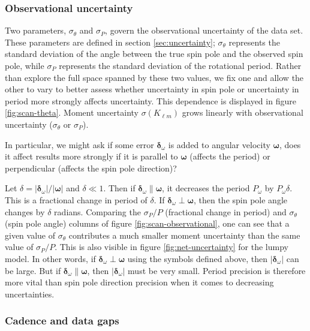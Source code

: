\documentclass[fleqn,usenatbib]{mnras}
\begin{document}
\subsubsection{Observational uncertainty}
\label{sec:scan-uncertainty}
Two parameters, $\sigma_\theta$ and $\sigma_P$, govern the observational uncertainty of the data set. These parameters are defined in section \ref{sec:uncertainty}; $\sigma_\theta$ represents the standard deviation of the angle between the true spin pole and the observed spin pole, while $\sigma_P$ represents the standard deviation of the rotational period. Rather than explore the full space spanned by these two values, we fix one and allow the other to vary to better assess whether uncertainty in spin pole or uncertainty in period more strongly affects uncertainty. This dependence is displayed in figure \ref{fig:scan-theta}. Moment uncertainty $\sigma(K_{\ell m})$ grows linearly with observational uncertainty ($\sigma_\theta$ or $\sigma_P$).

In particular, we might ask if some error $\bm {\delta}_\omega$ is added to angular velocity $\bm \omega$, does it affect results more strongly if it is parallel to $\bm \omega$ (affects the period) or perpendicular (affects the spin pole direction)?

Let $\delta = |\bm{\delta}_\omega| / |\bm \omega|$ and $\delta \ll 1$. Then if $\bm {\delta}_\omega \parallel \bm \omega$, it decreases the period $P_\omega$ by $P_\omega \delta$. This is a fractional change in period of $\delta$. If $\bm {\delta}_\omega \perp \bm \omega$, then the spin pole angle changes by $\delta$ radians. Comparing the $\sigma_P / P$ (fractional change in period) and $\sigma_\theta$ (spin pole angle) columns of figure \ref{fig:scan-observational}, one can see that a given value of $\sigma_\theta$ contributes a much smaller moment uncertainty than the same value of $\sigma_P/ P$. This is also visible in figure \ref{fig:net-uncertainty} for the lumpy model. In other words, if $\bm {\delta}_\omega \perp \bm \omega$ using the symbols defined above, then $|\bm {\delta}_\omega|$ can be large. But if $\bm{\delta}_\omega  \parallel \bm \omega$, then $|\bm {\delta}_\omega|$ must be very small. Period precision is therefore more vital than spin pole direction precision when it comes to decreasing uncertainties.


\subsubsection{Cadence and data gaps}
\label{sec:scan-cadence}
\end{document}
